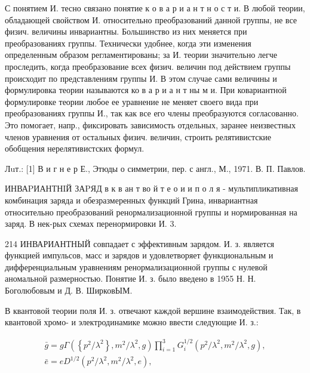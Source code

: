 \documentclass[10pt]{article}
\begin{document}
С понятием И. тесно связано понятие к о в а р и а н т н о с т и. В любой теории, обладающей свойством И. относительно преобразований данной группы, не все физич. величины инвариантны. Большинство из них меняется при преобразованиях группы. Технически удобнее, когда эти изменения определенным образом регламентированы; за И. теории значительно легче проследить, когда преобразование всех физич. величин под действием группы происходит по представлениям группы И. В этом случае сами величины и формулировка теории называются ко в а р и а н т ны м и. При ковариантной формулировке теории любое ее уравнение не меняет своего вида при преобразованиях группы И., так как все его члены преобразуются согласованно. Это помогает, напр., фиксировать зависимость отдельных, заранее неизвестных членов уравнения от остальных физич. величин, строить релятивистские обобщения нерелятивистских формул.



Лuт.: [1] В и г н е р Е., Этюды о симметрии, пер. с англ., М., 1971. В. П. Павлов.



ИНВАPИАНТНIЙ ЗАPЯД в к в ан т во й т е о и и п о л я - мультипликативная комбинация заряда и обезразмеренных функций Грина, инвариантная относительно преобразований ренормализационной группы и нормированная на заряд. В нек-рых схемах перенормировки И. 3.



214 ИНВАРИАНТНЫЙ совпадает с эффективным зарядом. И. з. является функцией импульсов, масс и зарядов и удовлетворяет функциональным и дифференциальным уравнениям ренормализационной группы с нулевой аномальной размерностью. Понятие И. з. было введено в 1955 Н. Н. Боголюбовым и Д. В. ШирковЫМ.



В квантовой теории поля И. з. отвечают каждой вершине взаимодействия. Так, в квантовой хромо- и электродинамике можно ввести следующие И. з.:



\[

\begin{gathered}

\bar{g}=g \Gamma\left(\left\{p^{2} / \lambda^{2}\right\}, m^{2} / \lambda^{2}, g\right) \prod_{i=1}^{3} G_{i}^{1 / 2}\left(p^{2} / \lambda^{2}, m^{2} / \lambda^{2}, g\right), \\

\bar{e}=e D^{1 / 2}\left(p^{2} / \lambda^{2}, m^{2} / \lambda^{2}, e\right),

\end{gathered}

\]
\end{document}

